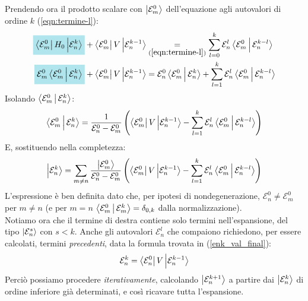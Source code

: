 \documentclass[../../FisicaTeorica.tex]{subfiles}
\begin{document}
Prendendo ora il prodotto scalare con $\Ket{\mathcal{E}_m^0}$ dell'equazione agli autovalori di ordine $k$ (\ref{eqn:termine-l}):
\begin{align*}
\hlc{SkyBlue}{{\bra{\mathcal{E}^0_m} H_0 \ket{\mathcal{E}^k_n}} }+ \bra{\mathcal{E}^0_m} V \ket{\mathcal{E}^{k-1}_n}
&\underset{(\ref{eqn:termine-l})}{=} \sum_{l=0}^k \mathcal{E}_n^l \braket{\mathcal{E}_m^0 | \mathcal{E}^{k-l}_n}\\
\hlc{SkyBlue}{\mathcal{E}_m^0\braket{\mathcal{E}_m^0|\mathcal{E}_n^k}} + \bra{\mathcal{E}_m^0}V\ket{\mathcal{E}_n^{k-1}}
&=\mathcal{E}_n^0 \braket{\mathcal{E}_m^0|\mathcal{E}_n^k} + \sum_{l=1}^{k}\mathcal{E}_n^l \braket{\mathcal{E}_m^0|\mathcal{E}_n^{k-l}}
\end{align*}
Isolando $\Braket{\mathcal{E}_m^0 | \mathcal{E}^k_n}$:
\begin{align*}
\Braket{\mathcal{E}^0_m | \mathcal{E}^k_n} = 
\frac{1}{\mathcal{E}^0_n - \mathcal{E}^0_m} \left(
\Bra{\mathcal{E}^0_m}V \Ket{\mathcal{E}_n^{k-1}} - \sum_{l=1}^{k} \mathcal{E}_n^l \Braket{\mathcal{E}^0_m| \mathcal{E}_n^{k-l}}\right)
\end{align*}
E, sostituendo nella completezza:
\begin{align}
\Ket{\mathcal{E}_n^k} = \sum_{m\neq n}\frac{\Ket{\mathcal{E}_m^0}}{\mathcal{E}_n^0-\mathcal{E}_m^0} \left( \Bra{\mathcal{E}_m^0}V\Ket{\mathcal{E}_n^{k-1}}-\sum_{l=1}^k \mathcal{E}_n^l \Braket{\mathcal{E}_m^0|\mathcal{E}_n^{k-l}}\right)
\label{eqn:Enk_final}
\end{align}
L'espressione è ben definita dato che, per ipotesi di nondegenerazione, $\mathcal{E}_n^0 \neq \mathcal{E}_m^0$ per $m\neq n$ (e per $m=n$ $\Braket{\mathcal{E}_m^0|\mathcal{E}_m^k}=\delta_{0,k}$ dalla normalizzazione).\\
Notiamo ora che il termine di destra contiene solo termini  nell'espansione, del tipo $\Ket{\mathcal{E}_n^s}$ con $s < k$. Anche gli autovalori $\mathcal{E}_n^l$ che compaiono richiedono, per essere calcolati, termini \textit{precedenti}, data la formula trovata in (\ref{enk_val_final}):
\begin{align*}
\mathcal{E}_n^k = \Bra{\mathcal{E}_n^0}V\Ket{\mathcal{E}^{k-1}_n}
\end{align*}
Perciò possiamo procedere \textit{iterativamente}, calcolando $\Ket{\mathcal{E}_n^{k+1}}$ a partire dai $\Ket{\mathcal{E}_n^k}$ di ordine inferiore già determinati, e così ricavare tutta l'espansione.\\
\end{document}
